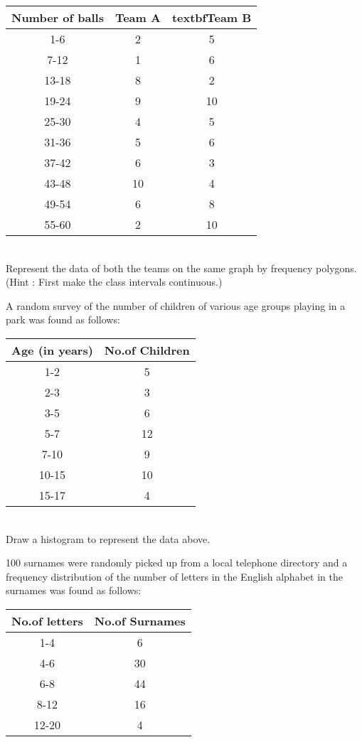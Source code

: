 \begin{tabular}{|c|c|c|}
\hline
\textbf{Number of balls} &\textbf{Team A}  &textbf{Team B}\\
\hline
1-6 &2 &5\\
7-12 &1 &6\\
13-18 &8 &2\\
19-24 &9 &10\\
25-30 &4 &5\\
31-36 &5 &6\\
37-42 &6 &3\\
43-48 &10 &4\\
49-54 &6 &8\\
55-60 &2 &10\\
\hline
\end{tabular}\\

Represent the data of both the teams on the same graph by frequency polygons.\\
(Hint : First make the class intervals continuous.)\\
\item A random survey of the number of children of various age groups playing in a park was found as follows:\\

\begin{tabular}{|c|c|}
\hline
\textbf{Age (in years)} &\textbf{No.of Children}\\
\hline
1-2 &5\\
2-3 &3\\
3-5 &6\\
5-7 &12\\
7-10 &9\\
10-15 &10\\
15-17 &4\\
\hline
\end{tabular}\\

Draw a histogram to represent the data above.\\
\item 100 surnames were randomly picked up from a local telephone directory and a frequency distribution of the number of letters in the English alphabet in the surnames was found as follows:\\

\begin{tabular}{|c|c|}
\hline
\textbf{No.of letters} &\textbf{No.of Surnames}\\
\hline
1-4 &6\\
4-6 &30\\
6-8 &44\\
8-12 &16\\
12-20 &4\\
\hline
\end{tabular}\\

